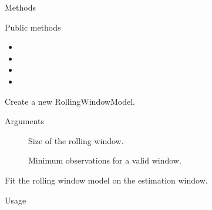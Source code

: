 \documentclass[a4paper]{book}
\begin{document}
\begin{Section}{Methods}
%
\begin{SubSection}{Public methods}
\begin{itemize}

\item{} 
\item{} 
\item{} 
\item{} 

\end{itemize}

\end{SubSection}



\hypertarget{method-RollingWindowModel-initialize}{}
%
\begin{SubSection}{}
Create a new RollingWindowModel.
%

%
\begin{SubSubSection}{Arguments}

\begin{description}

\item[] Size of the rolling window.
\item[] Minimum observations for a valid window.

\end{description}



\end{SubSubSection}

\end{SubSection}




\hypertarget{method-RollingWindowModel-fit}{}
%
\begin{SubSection}{}
Fit the rolling window model on the estimation window.
%
\begin{SubSubSection}{Usage}


\end{SubSubSection}
\end{SubSection}
\end{Section}
\end{document}
